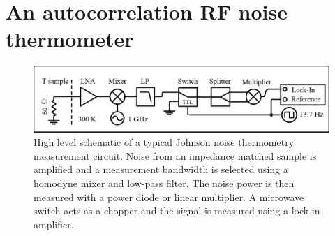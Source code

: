 \section{An autocorrelation RF noise thermometer}
\label{section:autocorrelation}
\begin{figure}
\centering
\includegraphics[width=\textwidth]{figures/Johnson_noise_thermometry/Schematic_Autocorrelation.png}
\caption[JNT autocorrelation schematic]{High level schematic of a typical Johnson noise thermometry measurement circuit. Noise from an impedance matched sample is amplified and a measurement bandwidth is selected using a homodyne mixer and low-pass filter. The noise power is then measured with a power diode or linear multiplier. A microwave switch acts as a chopper and the signal is measured using a lock-in amplifier.}
\label{fig:schematic_autocorrelation}
\end{figure}

